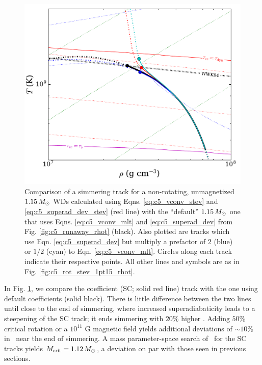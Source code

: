 


\begin{figure}
\centering
\includegraphics[angle=0,width=0.8\columnwidth]{chapter5_zhu+16/figures/diag_1pt15_rhot.pdf}
\caption{Comparison of a simmering track for a non-rotating, unmagnetized $1.15\,\Msun$ WDs calculated using Eqns. \ref{eq:c5_vconv_stev} and \ref{eq:c5_superad_dev_stev} (red line) with the ``default'' $1.15\,\Msun$ one that uses Eqns. \ref{eq:c5_vconv_mlt} and \ref{eq:c5_superad_dev} from Fig. \ref{fig:c5_runaway_rhot} (black).  Also plotted are tracks which use Eqn. \ref{eq:c5_superad_dev} but multiply a prefactor of $2$ (blue) or $1/2$ (cyan) to Eqn. \ref{eq:c5_vconv_mlt}.  Circles along each track indicate their respective \citeal{wooswk04} points.  All other lines and symbols are as in Fig. \ref{fig:c5_rot_stev_1pt15_rhot}.}
\label{fig:c5_mltcoeff_rhot}
\end{figure}

In Fig. \ref{fig:c5_mltcoeff_rhot}, we compare the \citeal{stev79} coefficient (SC; solid red line) track with the one using default coefficients (solid black).  There is little difference between the two lines until close to the end of simmering, where increased superadiabaticity leads to a steepening of the SC track; it ends simmering with $20$\% higher \rhoc.  Adding $50$\% critical rotation or a $10^{11}$ G magnetic field yields additional deviations of $\sim10$\% in \rhoc\ near the end of simmering.  A mass parameter-space search of \Mcrit\ for the SC tracks yields $\Mcrit = 1.12\,\Msun$, a deviation on par with those seen in previous sections.

